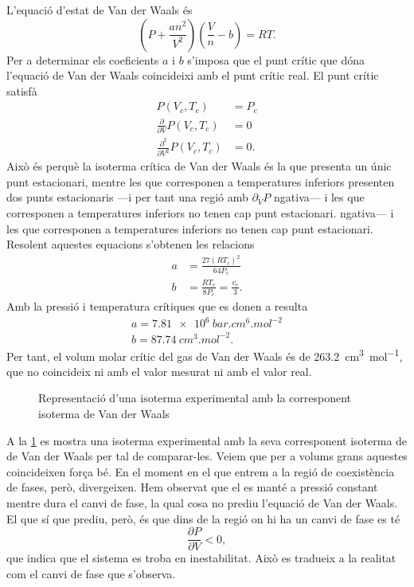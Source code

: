 \documentclass[12pt]{article}
\numberwithin{table}{section}
\numberwithin{figure}{section}
\numberwithin{equation}{section}
\begin{document}
L'equació d'estat de Van der Waals és
\begin{equation*}
	\left(P + \frac{an^2}{V^2}\right)\left(\frac{V}{n} - b\right) = RT.
\end{equation*}
Per a determinar els coeficients \( a \) i \( b \) s'imposa que el punt crític que dóna l'equació de Van der Waals coincideixi amb el punt crític real. El punt crític satisfà
\begin{align*}
	P(V_c, T_c) &= P_c \\
	\frac{\partial}{\partial V} P(V_c, T_c) &= 0 \\
	\frac{\partial^2}{\partial V^2} P(V_c, T_c) &= 0.
\end{align*}
Això és perquè la isoterma crítica de Van der Waals és la que presenta un únic punt estacionari, mentre les que corresponen a temperatures inferiors presenten dos punts estacionaris ---i per tant una regió amb \( \partial_V P \) ngativa--- i les que corresponen a temperatures inferiors no tenen cap punt estacionari.  ngativa--- i les que corresponen a temperatures inferiors no tenen cap punt estacionari. 
Resolent aquestes equacions s'obtenen les relacions
\begin{align*}
	a &= \frac{27(RT_c)^2}{64P_c} \\
	b &= \frac{RT_c}{8P_c} = \frac{v_c}{3}. 
\end{align*}
Amb la pressió i temperatura crítiques que es donen a \cite{nist} resulta
\begin{gather*}
 a = \SI{7.81e6}{bar . cm^6 . mol^{-2}} \\
 b = \SI{87.74}{cm^3. mol^{-2}}. 
\end{gather*}
Per tant, el volum molar crític del gas de Van der Waals és de \SI{263.2}{cm^3.mol^{-1}}, que no coincideix ni amb el valor mesurat ni amb el valor real. 

\begin{figure}[htb]
	\small \sffamily \centering
	
	\caption{Representació d'una isoterma experimental amb la corresponent isoterma de Van der Waals}
	\label{fig:vdw1}
\end{figure}

A la \cref{fig:vdw1} es mostra una isoterma experimental amb la seva corresponent isoterma de de Van der Waals per tal de comparar-les. Veiem que per a volums grans aquestes coincideixen força bé. En el moment en el que entrem a la regió de coexistència de fases, però, divergeixen. Hem observat que el es manté a pressió constant mentre dura el canvi de fase, la qual cosa no prediu l'equació de Van der Waals. El que sí que prediu, però, és que dins de la regió on hi ha un canvi de fase es té
\begin{equation*}
	\frac{\partial P}{\partial V} < 0,
\end{equation*}
que indica que el sistema es troba en inestabilitat. Això es tradueix a la realitat com el canvi de fase que s'observa.  
\end{document}
